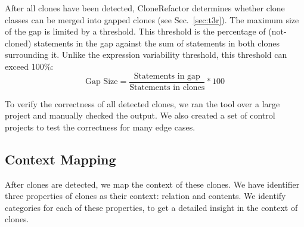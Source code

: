\documentclass[sigconf,review, table]{acmart}
\begin{document}
After all clones have been detected, CloneRefactor determines whether clone classes can be merged into gapped clones (see Sec.~\ref{sec:t3r}). The maximum size of the gap is limited by a threshold. This threshold is the percentage of (not-cloned) statements in the gap against the sum of statements in both clones surrounding it. Unlike the expression variability threshold, this threshold can exceed 100\%:
\begin{equation}\label{eq:type3r}
\text{Gap Size}=\frac{\text{Statements in gap}}{\text{Statements in clones}}*100
\end{equation}

To verify the correctness of all detected clones, we ran the tool over a large project and manually checked the output. We also created a set of control projects to test the correctness for many edge cases.

\subsection{Context Mapping} \label{sec:context}
After clones are detected, we map the context of these clones. We have identifier three properties of clones as their context: relation and contents. We identify categories for each of these properties, to get a detailed insight in the context of clones.
\end{document}
